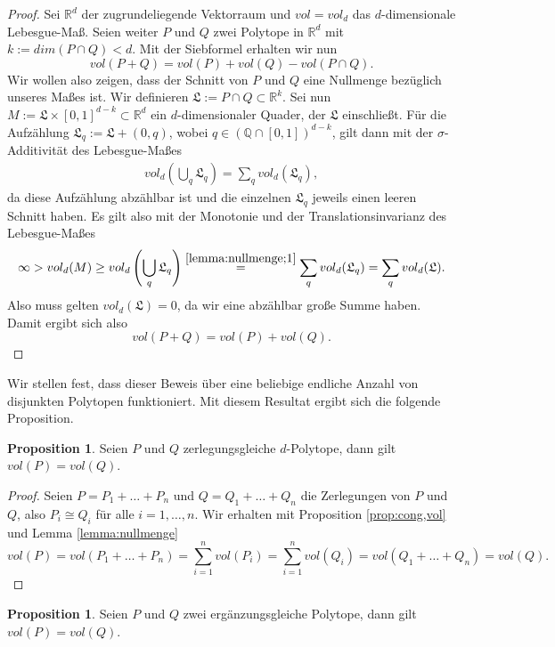 \documentclass[11pt,titlepage]{article}
\newcommand{\setQ}{\mathbb{Q}}
\newcommand{\setR}{\mathbb{R}}
\theoremstyle{definition}
\newtheorem{proposition}[theorem]{Proposition}
\theoremstyle{remark}
\begin{document}
	\begin{proof}
		Sei $\setR^d$ der zugrundeliegende Vektorraum und $vol=vol_d$ das $d$-dimensionale 
		Lebesgue-Maß. Seien weiter $P$ und $Q$ zwei Polytope in $\setR^d$ 
		mit $k:=dim(P\cap Q)<d$. Mit der Siebformel erhalten wir nun
		\[vol(P+Q)=vol(P)+vol(Q)-vol(P\cap Q).\]
		Wir wollen also zeigen, dass der Schnitt von $P$ und $Q$ eine Nullmenge bezüglich unseres Maßes ist. 
		Wir definieren $\mathfrak{L}:=P\cap Q \subset \setR^k$. Sei nun  $M:=\mathfrak{L}\times[0,1]^{d-k}\subset\setR^d$ ein $d$-dimensionaler Quader, der 
		$\mathfrak{L}$ einschließt. Für die Aufzählung $\mathfrak{L}_q:=\mathfrak{L}+(0,q)$, wobei $q\in(\setQ\cap[0,1])^{d-k}$, gilt dann mit der $\sigma$-Additivität des Lebesgue-Maßes
		\begin{align}
			vol_d \left(\bigcup_q\mathfrak{L}_q\right)=\sum_q vol_d(\mathfrak{L}_q), \label{lemma:nullmenge;1}
		\end{align}
		da diese Aufzählung abzählbar ist und die einzelnen $\mathfrak{L}_q$ jeweils einen leeren Schnitt haben. Es gilt also mit der Monotonie und der Translationsinvarianz des Lebesgue-Maßes
		\[\infty>vol_d(M)\geq vol_d\left(\bigcup_q \mathfrak{L}_q\right)\overset{\ref{lemma:nullmenge;1}}{=}\sum_q vol_d(\mathfrak{L}_q)=\sum_q vol_d(\mathfrak{L}).\]
		Also muss gelten $vol_d(\mathfrak{L})=0$, da wir eine abzählbar große Summe haben. 
		Damit ergibt sich also
		\[vol(P+Q)=vol(P)+vol(Q).\]
	\end{proof}

	Wir stellen fest, dass dieser Beweis über eine beliebige endliche Anzahl von disjunkten 
	Polytopen funktioniert. Mit diesem Resultat ergibt sich die folgende Proposition.
	
	\begin{proposition} \label{prop:zerl,vol}
		Seien $P$ und $Q$ zerlegungsgleiche $d$-Polytope, dann gilt $vol(P)=vol(Q)$.
	\end{proposition}
	
	\begin{proof}
		Seien $P=P_1+\ldots+P_n$ und $Q=Q_1+\ldots+Q_n$ die Zerlegungen von $P$ und 
		$Q$, also $P_i\cong Q_i$ für alle $i=1,\ldots,n$. Wir erhalten mit Proposition \ref{prop:cong,vol} und Lemma \ref{lemma:nullmenge} 
		\[vol(P)=vol(P_1+\ldots+P_n)=\sum_{i=1}^n vol(P_i)=\sum_{i=1}^n vol(Q_i)=vol(Q_1+\ldots+Q_n)=vol(Q).\]
	\end{proof}

	\begin{proposition}
		Seien $P$ und $Q$ zwei ergänzungsgleiche Polytope, dann gilt $vol(P)=vol(Q)$.
	\end{proposition}
	
\end{document}
